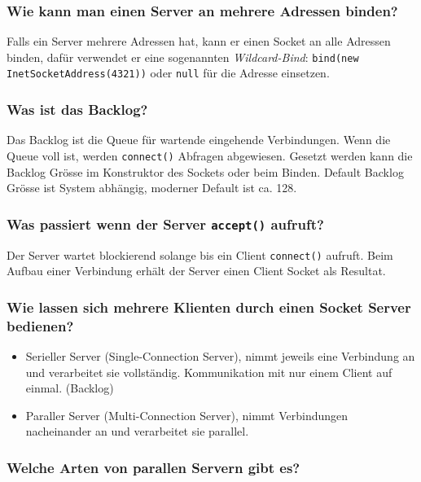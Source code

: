 \documentclass[10pt,a4paper]{scrartcl}
\begin{document}
\subsubsection{Wie kann man einen Server an mehrere Adressen binden?}

Falls ein Server mehrere Adressen hat, kann er einen Socket an alle Adressen binden, dafür
verwendet er eine sogenannten \textit{Wildcard-Bind}: \texttt{bind(new InetSocketAddress(4321))} oder
\texttt{null} für die Adresse einsetzen.
  
\subsubsection{Was ist das Backlog?}

Das Backlog ist die Queue für wartende eingehende Verbindungen. Wenn die Queue voll ist, werden
\texttt{connect()} Abfragen abgewiesen. Gesetzt werden kann die Backlog Grösse im Konstruktor des
Sockets oder beim Binden. Default Backlog Grösse ist System abhängig, moderner Default ist ca. 128. 
  
\subsubsection{Was passiert wenn der Server \texttt{accept()} aufruft?}

Der Server wartet blockierend solange bis ein Client \texttt{connect()} aufruft. Beim Aufbau einer
Verbindung erhält der Server einen Client Socket als Resultat.
  
\subsubsection{Wie lassen sich mehrere Klienten durch einen Socket Server bedienen? }

\begin{itemize}
	\item Serieller Server (Single-Connection Server), nimmt jeweils eine Verbindung an und
		verarbeitet sie vollständig. Kommunikation mit nur einem Client auf einmal. (Backlog)
	\item Paraller Server (Multi-Connection Server), nimmt Verbindungen nacheinander an und
		verarbeitet sie parallel. 
\end{itemize}
  
\subsubsection{Welche Arten von parallen Servern gibt es? }
\end{document}

